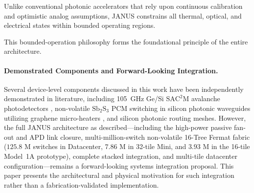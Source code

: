 \documentclass[journal]{IEEEtran}
\begin{document}
Unlike conventional photonic accelerators that rely upon continuous calibration and optimistic analog assumptions, JANUS constrains all thermal, optical, and electrical states within bounded operating regions.

This bounded-operation philosophy forms the foundational principle of the entire architecture.

\paragraph{\textbf{Demonstrated Components and Forward-Looking Integration.}}

Several device-level components discussed in this work have been independently demonstrated in literature, including 105~GHz Ge/Si $\mathrm{SAC^2M}$ avalanche photodetectors \cite{Chen2025}, non-volatile $\mathrm{Sb_2S_3}$ PCM switching in silicon photonic waveguides utilizing graphene micro-heaters \cite{Delaney2020,Rios2021}, and silicon photonic routing meshes. However, the full JANUS architecture as described---including the high-power passive fan-out and APD link closure, multi-million-switch non-volatile 16-Tree Fermat fabric ($125.8\text{ M}$ switches in Datacenter, $7.86\text{ M}$ in 32-tile Mini, and $3.93\text{ M}$ in the 16-tile Model~1A prototype), complete stacked integration, and multi-tile datacenter configuration---remains a forward-looking systems integration proposal. This paper presents the architectural and physical motivation for such integration rather than a fabrication-validated implementation.
\end{document}
